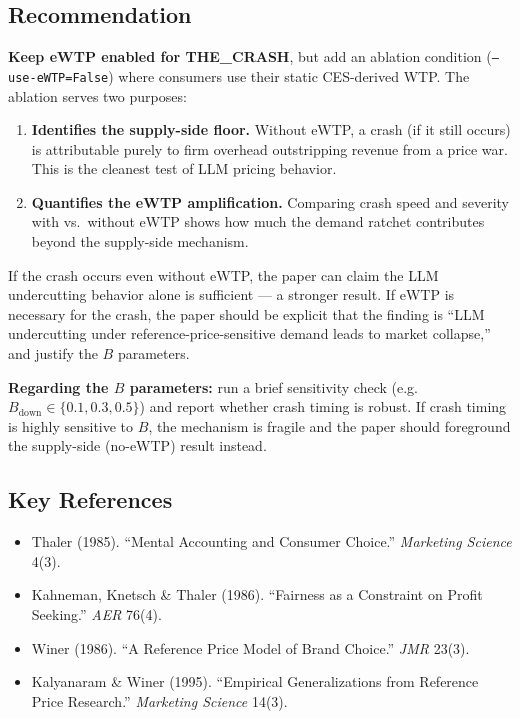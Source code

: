\documentclass{article}
\begin{document}
\subsection{Recommendation}

\textbf{Keep eWTP enabled for THE\_CRASH}, but add an ablation condition (\texttt{--use-eWTP=False}) where consumers use their static CES-derived WTP. The ablation serves two purposes:

\begin{enumerate}
  \item \textbf{Identifies the supply-side floor.} Without eWTP, a crash (if it still occurs) is attributable purely to firm overhead outstripping revenue from a price war. This is the cleanest test of LLM pricing behavior.
  \item \textbf{Quantifies the eWTP amplification.} Comparing crash speed and severity with vs.\ without eWTP shows how much the demand ratchet contributes beyond the supply-side mechanism.
\end{enumerate}

If the crash occurs even without eWTP, the paper can claim the LLM undercutting behavior alone is sufficient — a stronger result. If eWTP is necessary for the crash, the paper should be explicit that the finding is ``LLM undercutting under reference-price-sensitive demand leads to market collapse,'' and justify the $B$ parameters.

\textbf{Regarding the $B$ parameters:} run a brief sensitivity check (e.g.\ $B_{\text{down}} \in \{0.1, 0.3, 0.5\}$) and report whether crash timing is robust. If crash timing is highly sensitive to $B$, the mechanism is fragile and the paper should foreground the supply-side (no-eWTP) result instead.

\subsection{Key References}

\begin{itemize}
  \item Thaler (1985). ``Mental Accounting and Consumer Choice.'' \textit{Marketing Science} 4(3).
  \item Kahneman, Knetsch \& Thaler (1986). ``Fairness as a Constraint on Profit Seeking.'' \textit{AER} 76(4).
  \item Winer (1986). ``A Reference Price Model of Brand Choice.'' \textit{JMR} 23(3).
  \item Kalyanaram \& Winer (1995). ``Empirical Generalizations from Reference Price Research.'' \textit{Marketing Science} 14(3).
\end{itemize}
\end{document}
